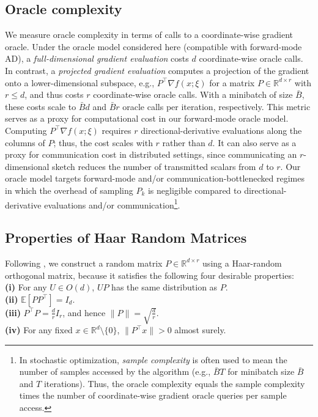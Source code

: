 \documentclass[10pt]{article}
\begin{document}
\subsection{Oracle complexity }
\label{sec:oracle-complexity}

We measure oracle complexity in terms of calls to a coordinate-wise gradient oracle.
Under the oracle model considered here (compatible with forward-mode AD), a \emph{full-dimensional gradient evaluation}
costs $d$ coordinate-wise oracle calls.
In contrast, a \emph{projected gradient evaluation} computes a projection of the gradient onto a
lower-dimensional subspace, e.g., $P^\top \nabla f(x;\xi)$ for a matrix $P\in\mathbb{R}^{d\times r}$ with $r\leq d$,
and thus costs $r$ coordinate-wise oracle calls.
With a minibatch of size $\bar{B}$, these costs scale to $\bar{B}d$ and $\bar{B}r$ oracle calls per iteration, respectively.
This metric serves as a proxy for computational cost in our forward-mode oracle model. 
Computing $P^\top \nabla f(x;\xi)$ requires $r$ directional-derivative evaluations along the columns of $P$; 
thus, the cost scales with $r$ rather than $d$. 
It can also serve as a proxy for communication cost in distributed settings, since communicating an $r$-dimensional sketch 
reduces the number of transmitted scalars from $d$ to $r$. 
Our oracle model targets forward-mode and/or communication-bottlenecked regimes in which the overhead of sampling $P_k$  is negligible compared to directional-derivative evaluations and/or communication\footnote{
In stochastic optimization, \emph{sample complexity} is often used to mean the number of samples accessed by the algorithm
(e.g., $\bar{B}T$ for minibatch size $\bar{B}$ and $T$ iterations). Thus, the oracle complexity equals the sample complexity times the number of coordinate-wise gradient oracle queries per sample access.
}.





\subsection{Properties of Haar Random Matrices}
\label{sec:haar-prop}

Following \citet{kozak2021}, we construct a random matrix $P\in\mathbb{R}^{d\times r}$ using a Haar-random orthogonal matrix, because it satisfies the following four desirable properties: \\
{\bf (i)} For any $U\in O(d)$, $UP$  has the same distribution as $P$.\\
{\bf (ii)} $\mathbb{E}[PP^\top]=I_d$.\\
{\bf (iii)} $P^\top P=\frac{d}{r}I_r$, and hence $\|P\|=\sqrt{\frac{d}{r}}$.\\
{\bf (iv)} For any fixed  $x\in\mathbb{R}^d\setminus\{0\}$, $\|P^\top x\|>0$ almost surely.
\end{document}
